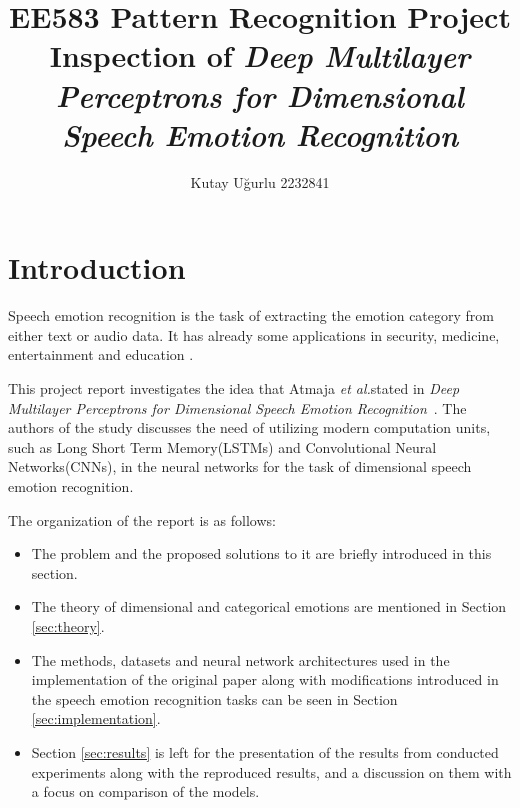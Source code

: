 \documentclass[a4paper,11pt]{article}
\author{Kutay U\u{g}urlu 2232841}
\begin{document}
    

\fancyfoot[C]{\thepage}

\title{\LARGE \LARGE EE583 Pattern Recognition Project \\ 
Inspection of \textit{Deep Multilayer Perceptrons for Dimensional Speech Emotion Recognition}}

\maketitle{\LARGE}
\pagebreak
\tableofcontents
\pagebreak

\section{Introduction}

Speech emotion recognition is the task of extracting the emotion category from either text or audio data. It has already some applications in security, medicine, entertainment and education \cite{cen2016real}. 

This project report investigates the idea that Atmaja \textit{et al.}stated in \textit{Deep Multilayer Perceptrons for Dimensional Speech Emotion Recognition}~\cite{atmaja2020deep}. The authors of the study discusses the need of utilizing modern computation units, such as Long Short Term Memory(LSTMs) and Convolutional Neural Networks(CNNs), in the neural networks for the task of dimensional speech emotion recognition. 

The organization of the report is as follows:
\begin{itemize}
    \item The problem and the proposed solutions to it are briefly introduced in this section.
    \item The theory of dimensional and categorical emotions are mentioned in Section \ref{sec:theory}.
    \item The methods, datasets and neural network architectures used in the implementation of the original paper along with modifications introduced in the speech emotion recognition tasks can be seen in Section \ref{sec:implementation}.
    \item Section \ref{sec:results} is left for the presentation of the results from conducted experiments along with the reproduced results, and a discussion on them with a focus on comparison of the models.   
\end{itemize}
\end{document}
